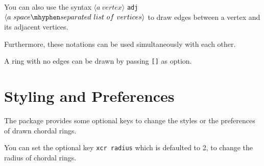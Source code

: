 \documentclass{article}
\begin{document}
\begin{LTXexample}[pos=r]
\end{LTXexample}

You can also use the syntax $\langle a\ vertex\rangle$ \lstinline{adj} $\langle a\ space\mhyphen separated\ list\ of\ vertices\rangle$ to draw edges between a vertex and its adjacent vertices.

\begin{LTXexample}[pos=r]
\end{LTXexample}

Furthermore, these notations can be used simultaneously with each other.

\begin{LTXexample}[pos=r]
\end{LTXexample}

A ring with no edges can be drawn by passing \lstinline{[]} as option.

\begin{LTXexample}[pos=r]
\end{LTXexample}

\section{Styling and Preferences}

The package provides some optional keys to change the styles or the preferences of drawn chordal rings.

You can set the optional key \lstinline{xcr radius} which is defaulted to 2, to change the radius of
chordal rings.

\begin{LTXexample}[pos=r]
\end{LTXexample}
\end{document}
